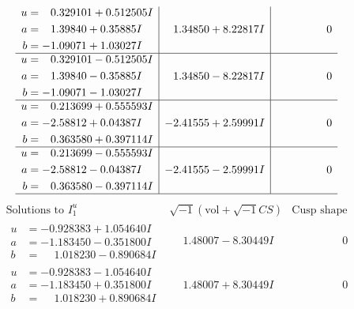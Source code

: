\documentclass[1p]{elsarticle_modified}
\theoremstyle{definition}
\newcommand{\I}{\sqrt{-1}}
\begin{document}
$$\begin{array}{c|c|c}
\begin{aligned}
u &= \phantom{-}0.329101 + 0.512505 I \\
a &= \phantom{-}1.39840 + 0.35885 I \\
b &= -1.09071 + 1.03027 I\end{aligned}
 & \phantom{-}1.34850 + 8.22817 I & \phantom{-0.000000 } 0 \\ \hline\begin{aligned}
u &= \phantom{-}0.329101 - 0.512505 I \\
a &= \phantom{-}1.39840 - 0.35885 I \\
b &= -1.09071 - 1.03027 I\end{aligned}
 & \phantom{-}1.34850 - 8.22817 I & \phantom{-0.000000 } 0 \\ \hline\begin{aligned}
u &= \phantom{-}0.213699 + 0.555593 I \\
a &= -2.58812 + 0.04387 I \\
b &= \phantom{-}0.363580 + 0.397114 I\end{aligned}
 & -2.41555 + 2.59991 I & \phantom{-0.000000 } 0 \\ \hline\begin{aligned}
u &= \phantom{-}0.213699 - 0.555593 I \\
a &= -2.58812 - 0.04387 I \\
b &= \phantom{-}0.363580 - 0.397114 I\end{aligned}
 & -2.41555 - 2.59991 I & \phantom{-0.000000 } 0\\
 \hline 
 \end{array}$$\newpage$$\begin{array}{c|c|c}  
\text{Solutions to }I^u_{1}& \I (\text{vol} + \sqrt{-1}CS) & \text{Cusp shape}\\
 \hline 
\begin{aligned}
u &= -0.928383 + 1.054640 I \\
a &= -1.183450 - 0.351800 I \\
b &= \phantom{-}1.018230 - 0.890684 I\end{aligned}
 & \phantom{-}1.48007 - 8.30449 I & \phantom{-0.000000 } 0 \\ \hline\begin{aligned}
u &= -0.928383 - 1.054640 I \\
a &= -1.183450 + 0.351800 I \\
b &= \phantom{-}1.018230 + 0.890684 I\end{aligned}
 & \phantom{-}1.48007 + 8.30449 I & \phantom{-0.000000 } 0 \\ \hline\begin{aligned}

\end{aligned}
\end{array}$$
\end{document}
